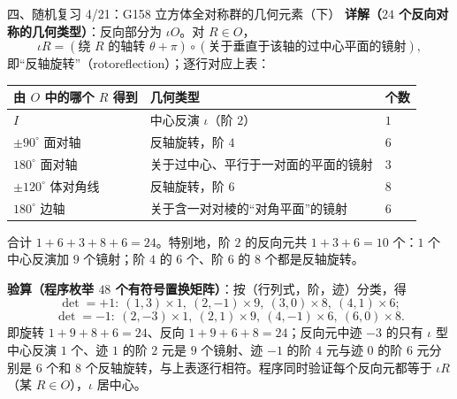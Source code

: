 \documentclass[aspectratio=169,10pt,fontset=none]{ctexbeamer}
\newcommand{\key}[1]{\textcolor{ink}{\bfseries #1}}
\begin{document}
\begin{frame}[t]{四、随机复习 4/21：G158 立方体全对称群的几何元素（下）}
\scriptsize
\key{详解（$24$ 个反向对称的几何类型）}：反向部分为 $\iota O$。对 $R\in O$，
\[ \iota R=(\text{绕 }R\text{ 的轴转 } \theta+\pi)\circ(\text{关于垂直于该轴的过中心平面的镜射}), \]
即“反轴旋转”（rotoreflection）；逐行对应上表：
\begin{center}
{\scriptsize
\begin{tabular}{@{}lll@{}}
\toprule
由 $O$ 中的哪个 $R$ 得到 & 几何类型 & 个数\\ \midrule
$I$ & 中心反演 $\iota$（阶 $2$） & $1$\\
$\pm90^\circ$ 面对轴 & 反轴旋转，阶 $4$ & $6$\\
$180^\circ$ 面对轴 & 关于过中心、平行于一对面的平面的镜射 & $3$\\
$\pm120^\circ$ 体对角线 & 反轴旋转，阶 $6$ & $8$\\
$180^\circ$ 边轴 & 关于含一对对棱的“对角平面”的镜射 & $6$\\ \bottomrule
\end{tabular}}
\end{center}
合计 $1+6+3+8+6=24$。特别地，阶 $2$ 的反向元共 $1+3+6=10$ 个：$1$ 个中心反演加 $9$ 个镜射；阶 $4$ 的 $6$ 个、阶 $6$ 的 $8$ 个都是反轴旋转。

\key{验算（程序枚举 $48$ 个有符号置换矩阵）}：按（行列式，阶，迹）分类，得
\[ \det=+1:\ (1,3)\!\times\!1,\ (2,-1)\!\times\!9,\ (3,0)\!\times\!8,\ (4,1)\!\times\!6; \]
\[ \det=-1:\ (2,-3)\!\times\!1,\ (2,1)\!\times\!9,\ (4,-1)\!\times\!6,\ (6,0)\!\times\!8. \]
即旋转 $1+9+8+6=24$、反向 $1+9+6+8=24$；反向元中迹 $-3$ 的只有 $\iota$ 型中心反演 $1$ 个、迹 $1$ 的阶 $2$ 元是 $9$ 个镜射、迹 $-1$ 的阶 $4$ 元与迹 $0$ 的阶 $6$ 元分别是 $6$ 个和 $8$ 个反轴旋转，与上表逐行相符。程序同时验证每个反向元都等于 $\iota R$（某 $R\in O$），$\iota$ 居中心。
\end{frame}
\end{document}
